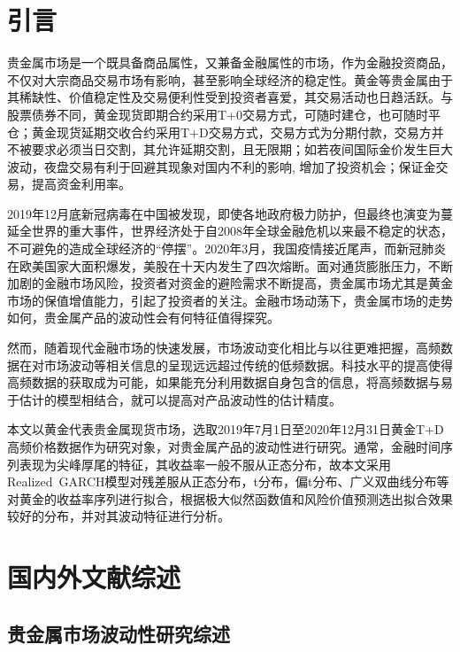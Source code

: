 \documentclass[UTF8,a4paper,12pt]{ctexart}  %
\author{\CJKfamily{kai} 金 \enspace 林 \\ \CJKfamily{kai} 中南财经政法大学统计系 \\ jinlin82@gmail.com}
\title{}
\author{}
\date{}
\begin{document}
\hypertarget{section}{%
\section{引言}\label{section}}

贵金属市场是一个既具备商品属性，又兼备金融属性的市场，作为金融投资商品，不仅对大宗商品交易市场有影响，甚至影响全球经济的稳定性。黄金等贵金属由于其稀缺性、价值稳定性及交易便利性受到投资者喜爱，其交易活动也日趋活跃。与股票债券不同，黄金现货即期合约采用T+0交易方式，可随时建仓，也可随时平仓；黄金现货延期交收合约采用T+D交易方式，交易方式为分期付款，交易方并不被要求必须当日交割，其允许延期交割，且无限期；如若夜间国际金价发生巨大波动，夜盘交易有利于回避其现象对国内不利的影响,
增加了投资机会；保证金交易，提高资金利用率\citep{郭凡礼2015}。

2019年12月底新冠病毒在中国被发现，即使各地政府极力防护，但最终也演变为蔓延全世界的重大事件，世界经济处于自2008年全球金融危机以来最不稳定的状态，不可避免的造成全球经济的``停摆''。2020年3月，我国疫情接近尾声，而新冠肺炎在欧美国家大面积爆发，美股在十天内发生了四次熔断。面对通货膨胀压力，不断加剧的金融市场风险，投资者对资金的避险需求不断提高，贵金属市场尤其是黄金市场的保值增值能力，引起了投资者的关注。金融市场动荡下，贵金属市场的走势如何，贵金属产品的波动性会有何特征值得探究。

然而，随着现代金融市场的快速发展，市场波动变化相比与以往更难把握，高频数据在对市场波动等相关信息的呈现远远超过传统的低频数据。科技水平的提高使得高频数据的获取成为可能，如果能充分利用数据自身包含的信息，将高频数据与易于估计的模型相结合，就可以提高对产品波动性的估计精度。

本文以黄金代表贵金属现货市场，选取2019年7月1日至2020年12月31日黄金T+D高频价格数据作为研究对象，对贵金属产品的波动性进行研究。通常，金融时间序列表现为尖峰厚尾的特征，其收益率一般不服从正态分布，故本文采用Realized~GARCH模型对残差服从正态分布，t分布，偏t分布、广义双曲线分布等对黄金的收益率序列进行拟合，根据极大似然函数值和风险价值预测选出拟合效果较好的分布，并对其波动特征进行分析。

\hypertarget{section-1}{%
\section{国内外文献综述}\label{section-1}}

\hypertarget{section-2}{%
\subsection{贵金属市场波动性研究综述}\label{section-2}}
\end{document}

